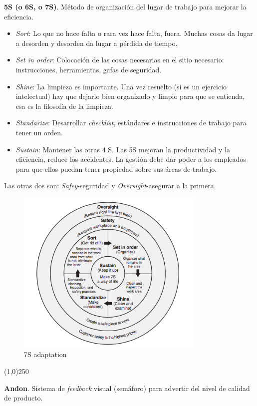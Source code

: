 \documentclass[oneside]{book}
\begin{document}
\textbf{5S (o 6S, o 7S)}. Método de organización del lugar de trabajo para mejorar la eficiencia. \begin{itemize} \item \textit{Sort}: Lo que no hace falta o rara vez hace falta, fuera. Muchas cosas da lugar a desorden y desorden da lugar a pérdida de tiempo. \item \textit{Set in order}: Colocación de las cosas necesarias en el sitio necesario: instrucciones, herramientas, gafas de seguridad. \item \textit{Shine}: La limpieza es importante. Una vez resuelto (si es un ejercicio intelectual) hay que dejarlo bien organizado y limpio para que se entienda, esa es la filosofía de la limpieza. \item \textit{Standarize}: Desarrollar \textit{checklist}, estándares e instrucciones de trabajo para tener un orden. \item \textit{Sustain}: Mantener las otras 4 S. Las 5S mejoran la productividad y la eficiencia, reduce los accidentes. La gestión debe dar poder a los empleados para que ellos puedan tener propiedad sobre sus áreas de trabajo. \end{itemize} Las otras dos son: \textit{Safey}-seguridad y \textit{Oversight}-asegurar a la primera. 

\begin{figure}[ht!]
	\centering
	\includegraphics[width=90mm]{imagenes/7S.png}
	\caption{7S adaptation}
	\label{fig:Las7S}
\end{figure}

\begin{center}
	\line(1,0){250}
\end{center}

\textbf{Andon}. Sistema de \textit{feedback} visual (semáforo) para advertir del nivel de calidad de producto.
\end{document}
